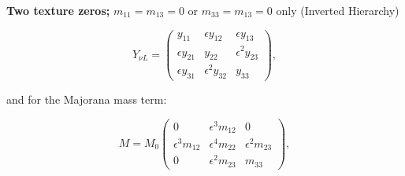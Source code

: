 \textbf{Two texture zeros;} $m_{11} = m_{13} = 0$ or $m_{33} = m_{13} = 0$ only (Inverted Hierarchy)

\begin{equation} \label{General Yukawa Neutrino}
    Y_{\nu L} = 
    \begin{pmatrix}
        y_{11} &\epsilon y_{12} & \epsilon y_{13} \\
        \epsilon y_{21}&y_{22}&\epsilon^{2}y_{23}\\
        \epsilon y_{31}& \epsilon^{2}y_{32}&y_{33}
    \end{pmatrix},
\end{equation}

and for the Majorana mass term:

\begin{equation} \label{General Majorana Mass}
    M = M_0
    \begin{pmatrix}
    0&\epsilon^{3}m_{12}& 0\\
    
    \epsilon^{3} m_{12} & \epsilon^{4} m_{22}& \epsilon^{2} m_{23}\\
    
    0 & \epsilon^{2}m_{23}&m_{33} 
    \end{pmatrix},
\end{equation}

